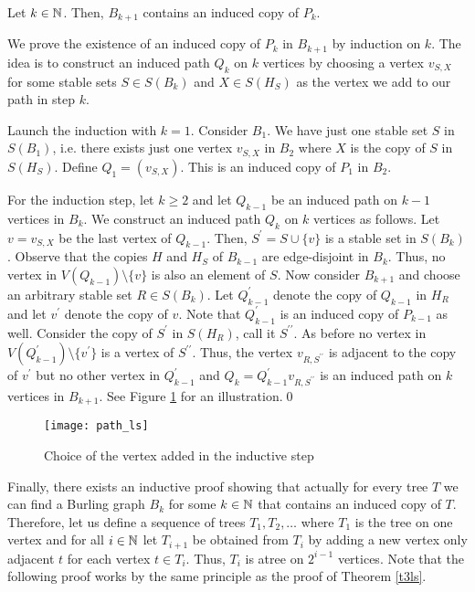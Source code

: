 \begin{thm}\label{t3ls}
Let $k\in\mathbb{N}$. Then, $B_{k+1}$ contains an induced copy of $P_k$.
\end{thm}
\begin{prf}
We prove the existence of an induced copy of $P_k$ in $B_{k+1}$ by induction on $k$. The idea is to construct an induced path $Q_k$ on $k$ vertices by choosing a vertex $v_{S,X}$ for some stable sets $S\in S(B_k)$ and $X\in S(H_S)$ as the vertex we add to our path in step $k$.

Launch the induction with $k=1$. Consider $B_1$. We have just one stable set $S$ in $S(B_1)$, i.e. there exists just one vertex $v_{S,X}$ in $B_2$ where $X$ is the copy of $S$ in $S(H_S)$. Define $Q_1=(v_{S,X})$. This is an induced copy of $P_1$  in $B_2$.

For the induction step, let $k\geq 2$ and let $Q_{k-1}$ be an induced path on $k-1$ vertices in $B_k$. We construct an induced path $Q_k$ on $k$ vertices as follows. Let $v=v_{S,X}$ be the last vertex of $Q_{k-1}$. Then, $S^\prime = S\cup \lbrace v\rbrace$ is a stable set in $S(B_k)$. Observe that the copies $H$ and $H_S$ of $B_{k-1}$ are edge-disjoint in $B_k$. Thus, no vertex in $V(Q_{k-1})\setminus\lbrace v\rbrace$ is also an element of $S$. Now consider $B_{k+1}$ and choose an arbitrary stable set $R\in S(B_k)$. Let $Q_{k-1}^\prime$ denote the copy of $Q_{k-1}$ in $H_R$ and let $v^\prime$ denote the copy of $v$. Note that $Q_{k-1}^\prime$ is an induced copy of $P_{k-1}$ as well. Consider the copy of $S^\prime$ in $S(H_R)$, call it $S^{\prime\prime}$. As before no vertex in $V(Q_{k-1}^\prime )\setminus\lbrace v^\prime\rbrace$ is a vertex of $S^{\prime\prime}$. Thus, the vertex $v_{R,S^{\prime\prime}}$ is adjacent to the copy of $v^\prime$ but no other vertex in $Q_{k-1}^\prime$ and $Q_k=Q_{k-1}^\prime v_{R,S^{\prime\prime}}$ is an induced path on $k$ vertices in $B_{k+1}$. See Figure \ref{f3ls} for an illustration.\qed
\end{prf}

\begin{figure}[ht]
\begin{center}
\texttt{[image: path\_ls]}
\end{center}
\caption{Choice of the vertex added in the inductive step}
\label{f3ls}
\end{figure}

Finally, there exists an inductive proof showing that actually for every tree $T$ we can find a Burling graph $B_k$ for some $k\in\mathbb{N}$ that contains an induced copy of $T$. Therefore, let us define a sequence of trees $T_1, T_2, \dots$ where $T_1$ is the tree on one vertex and for all $i\in\mathbb{N}$ let $T_{i+1}$ be obtained from $T_i$ by adding a new vertex only adjacent $t$ for each vertex $t\in T_i$. Thus, $T_i$ is atree on $2^{i-1}$ vertices. Note that the following proof works by the same principle as the proof of Theorem \ref{t3ls}.

